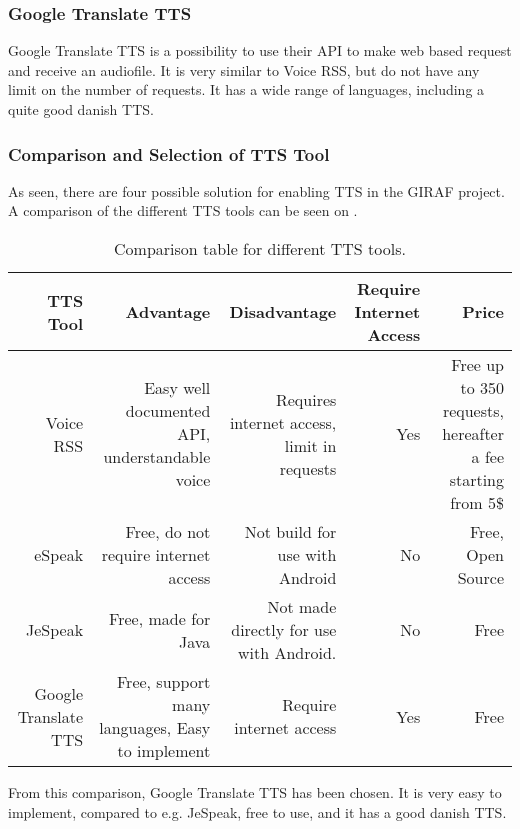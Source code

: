 \subsubsection{Google Translate TTS}
Google Translate TTS is a possibility to use their API to make web based request and receive an audiofile. It is very similar to Voice RSS, but do not have any limit on the number of requests. It has a wide range of languages, including a quite good danish TTS. 

\subsubsection{Comparison and Selection of TTS Tool}
As seen, there are four possible solution for enabling TTS in the GIRAF project. A comparison of the different TTS tools can be seen on .

\begin{table}[H]
    \begin{tabularx}{\textwidth}{|R|R|R|R|R|}
    \hline
    \textbf{TTS Tool}             &\textbf{Advantage}                                   &\textbf{Disadvantage}                               & \textbf{Require Internet Access} &\textbf{Price}                                                      \\ \hline
    Voice RSS            & Easy well documented API, understandable voice    & Requires internet access, limit in requests & Yes                     & Free up to 350 requests, hereafter a fee starting from 5\$ \\ \hline
    eSpeak               & Free, do not require internet access            & Not build for use with Android             & No                      & Free, Open Source                                          \\ \hline
    JeSpeak              & Free, made for Java                             & Not made directly for use with Android.    & No                      & Free                                                       \\ \hline
    Google Translate TTS & Free, support many languages, Easy to implement & Require internet access                    & Yes                     & Free                                                       \\ \hline
    \end{tabularx}
    \caption{Comparison table for different TTS tools.}
    \label{tab:ttscomp}
\end{table}

From this comparison, Google Translate TTS has been chosen. It is very easy to implement, compared to e.g. JeSpeak, free to use, and it has a good danish TTS.